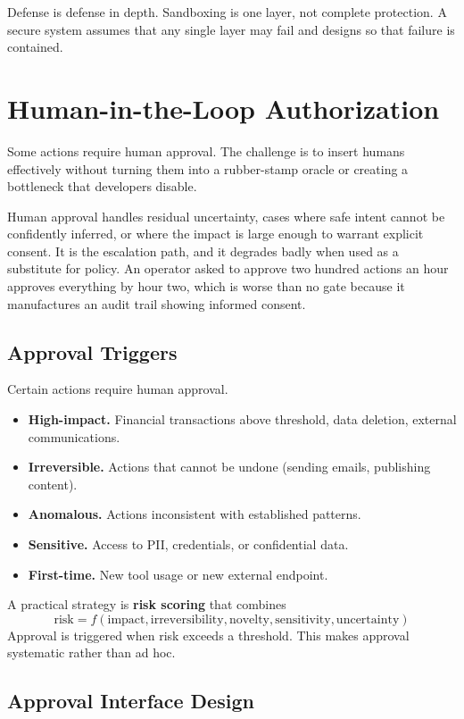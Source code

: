 Defense is defense in depth. Sandboxing is one layer, not complete protection. A secure system assumes that any single layer may fail and designs so that failure is contained.

\section{Human-in-the-Loop Authorization}

Some actions require human approval. The challenge is to insert humans effectively without turning them into a rubber-stamp oracle or creating a bottleneck that developers disable.

Human approval handles residual uncertainty, cases where safe intent cannot be
confidently inferred, or where the impact is large enough to warrant explicit
consent. It is the escalation path, and it degrades badly when used as a
substitute for policy. An operator asked to approve two hundred actions an hour
approves everything by hour two, which is worse than no gate because it
manufactures an audit trail showing informed consent.

\subsection{Approval Triggers}

Certain actions require human approval.
\begin{itemize}
\item \textbf{High-impact.} Financial transactions above threshold, data deletion, external communications.
\item \textbf{Irreversible.} Actions that cannot be undone (sending emails, publishing content).
\item \textbf{Anomalous.} Actions inconsistent with established patterns.
\item \textbf{Sensitive.} Access to PII, credentials, or confidential data.
\item \textbf{First-time.} New tool usage or new external endpoint.
\end{itemize}

A practical strategy is \textbf{risk scoring} that combines
\[
\text{risk} = f(\text{impact}, \text{irreversibility}, \text{novelty}, \text{sensitivity}, \text{uncertainty})
\]
Approval is triggered when risk exceeds a threshold. This makes approval systematic rather than ad hoc.

\subsection{Approval Interface Design}

